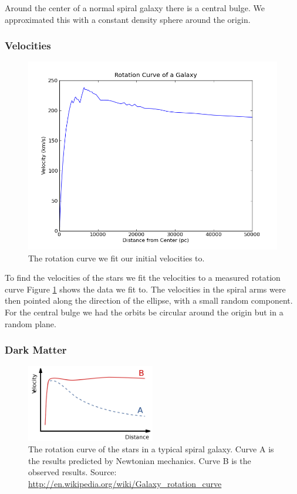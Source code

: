 \documentclass{report}
\begin{document}
Around the center of a normal spiral galaxy there is a central bulge. We approximated this with a constant density sphere around the origin. 

\subsubsection{Velocities}
\begin{figure}
\centering
\includegraphics[width=.8\columnwidth]{rotation_curve.png}
\caption{The rotation curve we fit our initial velocities to. \cite{velocity-distributions} } 
\label{fig:vel}
\end{figure}
To find the velocities of the stars we fit the velocities to a measured rotation curve \cite{velocity-distributions} Figure \ref{fig:vel} shows the data we fit to. The velocities in the spiral arms were then pointed along the direction of the ellipse, with a small random component. For the central bulge we had the orbits be circular around the origin but in a random plane. 
\subsubsection{Dark Matter}
\begin{figure}[H]
 \centering
 \includegraphics[width=0.5\textwidth]{./rotation.png}
  \caption{The rotation curve of the stars in a typical spiral galaxy. Curve A is the results predicted by
 Newtonian mechanics. Curve B is the observed results. Source:  \url{http://en.wikipedia.org/wiki/Galaxy_rotation_curve} } 
 \label{fig:rot}
\end{figure}
\end{document}
